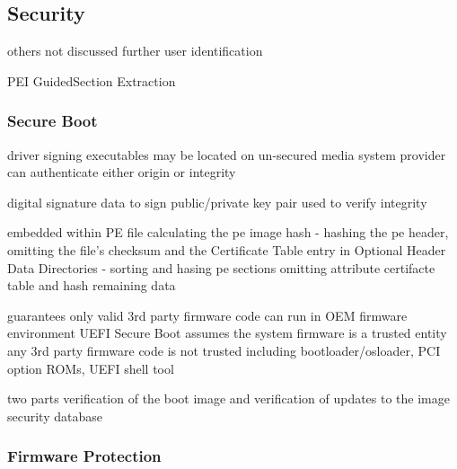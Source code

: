 
\subsection{Security}

others not discussed further
user identification

PEI
GuidedSection Extraction


\subsubsection{Secure Boot}

\cite{tianocore-understanding-uefi-secure-boot-chain}

driver signing
executables may be located on un-secured media
system provider can authenticate either origin or integrity

digital signature
data to sign
public/private key pair used to verify integrity


embedded within PE file
calculating the pe image hash
- hashing the pe header, omitting the file's checksum and the Certificate Table entry in Optional Header Data Directories
- sorting and hasing pe sections
omitting attribute certifacte table and hash remaining data

\cite{microsoft-pe-signature-format}




guarantees only valid 3rd party firmware code can run in OEM firmware environment
UEFI Secure Boot assumes the system firmware is a trusted entity
any 3rd party firmware code is not trusted
including bootloader/osloader, PCI option ROMs, UEFI shell tool

two parts
verification of the boot image and verification of updates to the image security database
\cite{tianocore-understanding-uefi-secure-boot-chain}


\subsubsection{Firmware Protection}

